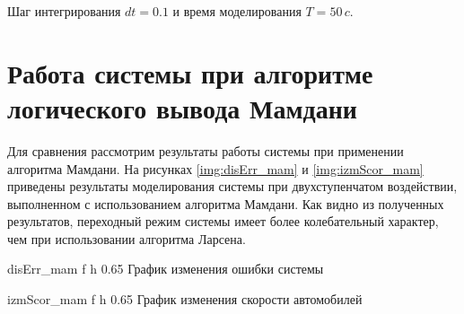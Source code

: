 Шаг интегрирования \( dt = 0.1 \) и время моделирования \( T = 50 \, c \).

\section{Работа системы при алгоритме логического вывода Мамдани}
Для сравнения рассмотрим результаты работы системы при применении алгоритма Мамдани.
На рисунках \ref{img:disErr_mam} и \ref{img:izmScor_mam} 
приведены результаты моделирования системы при 
двухступенчатом воздействии, выполненном с использованием 
алгоритма Мамдани. Как видно из полученных результатов, 
переходный режим системы имеет более колебательный характер, чем
при использовании алгоритма Ларсена.

        {disErr_mam}
        {f}
        {h}
        {0.65\textwidth}
        {График изменения ошибки системы}

        {izmScor_mam}
        {f}
        {h}
        {0.65\textwidth}
        {График изменения скорости автомобилей}

